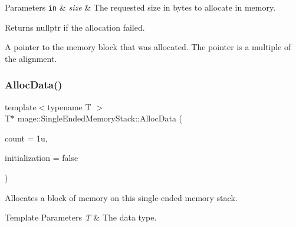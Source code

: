 \begin{DoxyParams}[1]{Parameters}
\mbox{\tt in}  & {\em size} & The requested size in bytes to allocate in memory. \\
\hline
\end{DoxyParams}
\begin{DoxyReturn}{Returns}
{\ttfamily nullptr} if the allocation failed. 

A pointer to the memory block that was allocated. The pointer is a multiple of the alignment. 
\end{DoxyReturn}
\mbox{\label{classmage_1_1_single_ended_memory_stack_a169a8191a16fb2a0a69607ab9bd5a82e}} 
\subsubsection{\texorpdfstring{Alloc\+Data()}{AllocData()}}
{\footnotesize\ttfamily template$<$typename T $>$ \\
T$\ast$ mage\+::\+Single\+Ended\+Memory\+Stack\+::\+Alloc\+Data (\begin{DoxyParamCaption}\item[{std\+::size\+\_\+t}]{count = {\ttfamily 1u},  }\item[{bool}]{initialization = {\ttfamily false} }\end{DoxyParamCaption})}

Allocates a block of memory on this single-\/ended memory stack.


\begin{DoxyTemplParams}{Template Parameters}
{\em T} & The data type. \\
\hline
\end{DoxyTemplParams}

